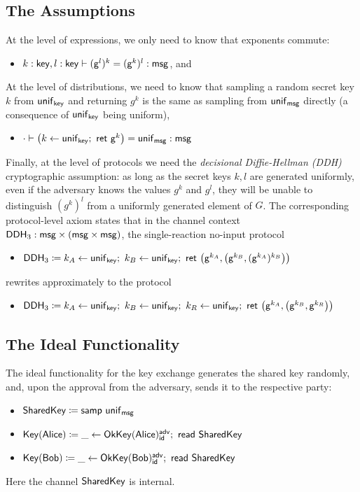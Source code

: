 \subsection{The Assumptions}
At the level of expressions, we only need to know that exponents commute:
\begin{itemize}
\item $k : \mathsf{key}, l : \mathsf{key} \vdash (\mathsf{g}^l)^k = (\mathsf{g}^k)^l : \mathsf{msg}$, and
\end{itemize}
At the level of distributions, we need to know that sampling a random secret key $k$ from $\mathsf{unif}_{\mathsf{key}}$ and returning $g^k$ is the same as sampling from $\mathsf{unif}_{\mathsf{msg}}$ directly (a consequence of $\mathsf{unif}_{\mathsf{key}}$ being uniform),
\begin{itemize}
\item $\cdot \vdash \big(k \leftarrow \mathsf{unif}_{\mathsf{key}}; \ \mathsf{ret} \ \mathsf{g}^k\big) = \mathsf{unif}_{\mathsf{msg}} : \mathsf{msg}$
\end{itemize}
Finally, at the level of protocols we need the \emph{decisional Diffie-Hellman (DDH)} cryptographic assumption: as long as the secret keys $k,l$ are generated uniformly, even if the adversary knows the values $g^k$ and $g^l$, they will be unable to distinguish $(g^k)^l$ from a uniformly generated element of $G$. The corresponding protocol-level axiom states that in the channel context $\mathsf{DDH}_3 : \mathsf{msg} \times (\mathsf{msg} \times \mathsf{msg})$, the single-reaction no-input protocol
\begin{itemize}
\item $\mathsf{DDH}_3 \coloneqq k_A \leftarrow \mathsf{unif}_{\mathsf{key}}; \ k_B \leftarrow \mathsf{unif}_{\mathsf{key}}; \ \mathsf{ret} \ \big(\mathsf{g}^{k_A}, \big(\mathsf{g}^{k_B}, (\mathsf{g}^{k_A})^{k_B}\big)\big)$
\end{itemize}
rewrites approximately to the protocol
\begin{itemize}
\item $\DDH_3 \coloneqq k_A \leftarrow \unif_\key; \ k_B \leftarrow \unif_\key; \ k_R \leftarrow \unif_\key; \ \ret{\big(\gen^{k_A}, \big(\gen^{k_B}, \gen^{k_R}\big)\big)}$
\end{itemize}

\subsection{The Ideal Functionality}
The ideal functionality for the key exchange generates the shared key randomly, and, upon the approval from the adversary, sends it to the respective party:
\begin{itemize}
\item $\mathsf{SharedKey} \coloneqq \mathsf{samp} \ \mathsf{unif}_{\mathsf{msg}}$
\item $\mathsf{Key}(\mathsf{Alice}) \coloneqq \_ \leftarrow \mathsf{OkKey}(\mathsf{Alice})^{\mathsf{adv}}_{\mathsf{id}}; \ \mathsf{read} \ \mathsf{SharedKey}$
\item $\mathsf{Key}(\mathsf{Bob}) \coloneqq \_ \leftarrow \mathsf{OkKey}(\mathsf{Bob})^{\mathsf{adv}}_{\mathsf{id}}; \ \mathsf{read} \ \mathsf{SharedKey}$
\end{itemize}
Here the channel $\mathsf{SharedKey}$ is internal.

